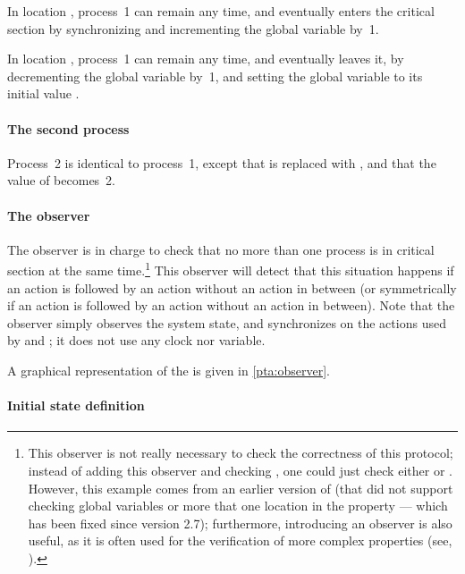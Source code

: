 In location , process~1 can remain any time, and eventually enters the critical section by synchronizing  and incrementing the global variable  by~1.

In location , process~1 can remain any time, and eventually leaves it, by decrementing the global variable  by~1, and setting the global variable  to its initial value .

\paragraph{The second process}
Process~2 is identical to process~1, except that  is replaced with , and that the value of  becomes~2.


\paragraph{The observer}
The observer is in charge to check that no more than one process is in critical section at the same time.\footnote{%
	This observer is not really necessary to check the correctness of this protocol;
	instead of adding this observer and checking , one could just check either  or .
	However, this example comes from an earlier version of \imitator{} (that did not support checking global variables or more that one location in the  property --- which has been fixed since version 2.7); furthermore, introducing an observer is also useful, as it is often used for the verification of more complex properties (see, \eg{} \cite{ABL98,ABBL98}).
}
This observer will detect that this situation happens if an action  is followed by an action  without an action  in between (or symmetrically if an action  is followed by an action  without an action  in between).
Note that the observer simply observes the system state, and synchronizes on the actions used by  and ; it does not use any clock nor variable.

A graphical representation of the \IPTA{}  is given in \cref{pta:observer}.


\paragraph{Initial state definition}


